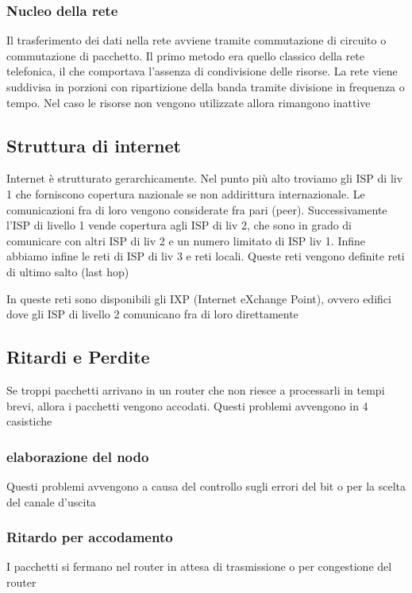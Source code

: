 \documentclass[12pt, a4paper]{article}
\begin{document}
\subsubsection*{Nucleo della rete}
Il trasferimento dei dati nella rete avviene tramite commutazione di circuito o commutazione di pacchetto. Il primo metodo 
era quello classico della rete telefonica, il che comportava l'assenza di condivisione delle risorse. La rete viene suddivisa 
in porzioni con ripartizione della banda tramite divisione in frequenza o tempo. Nel caso le risorse non vengono utilizzate
allora rimangono inattive

\subsection{Struttura di internet}
Internet è strutturato gerarchicamente. Nel punto più alto troviamo gli ISP di liv 1 che forniscono copertura nazionale se 
non addirittura internazionale. Le comunicazioni fra di loro vengono considerate fra pari (peer).
Successivamente l'ISP di livello 1 vende copertura agli ISP di liv 2, che sono in grado di comunicare con altri ISP di 
liv 2 e un numero limitato di ISP liv 1. Infine abbiamo infine le reti di ISP di liv 3 e reti locali. Queste reti vengono 
definite reti di ultimo salto (last hop)

In queste reti sono disponibili gli IXP (Internet eXchange Point), ovvero edifici dove gli ISP di livello 2 comunicano fra 
di loro direttamente

\subsection*{Ritardi e Perdite}
Se troppi pacchetti arrivano in un router che non riesce a processarli in tempi brevi, allora i pacchetti vengono accodati.
Questi problemi avvengono in 4 casistiche

\subsubsection*{elaborazione del nodo}
Questi problemi avvengono a causa del controllo sugli errori del bit o per la scelta del canale d'uscita

\subsubsection*{Ritardo per accodamento}
I pacchetti si fermano nel router in attesa di trasmissione o per congestione del router
\end{document}
